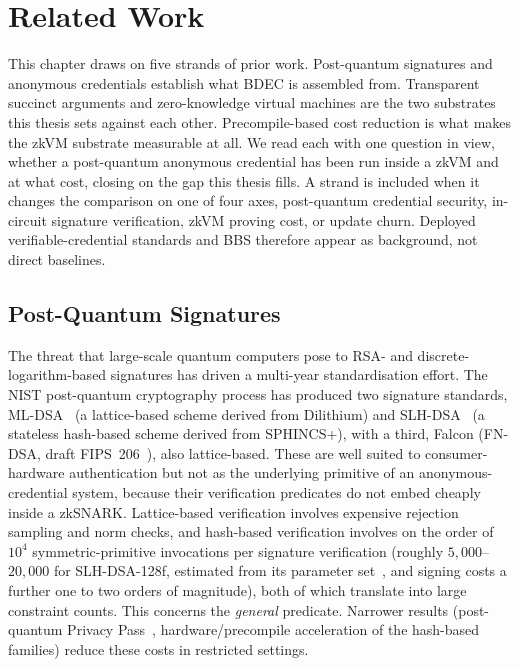 \section{Related Work}\label{sec:related}
This chapter draws on five strands of prior work. Post-quantum signatures and anonymous credentials establish what BDEC is assembled from. Transparent succinct arguments and zero-knowledge virtual machines are the two substrates this thesis sets against each other. Precompile-based cost reduction is what makes the zkVM substrate measurable at all. We read each with one question in view, whether a post-quantum anonymous credential has been run inside a zkVM and at what cost, closing on the gap this thesis fills. A strand is included when it changes the comparison on one of four axes, post-quantum credential security, in-circuit signature verification, zkVM proving cost, or update churn. Deployed verifiable-credential standards and BBS therefore appear as background, not direct baselines.

\subsection{Post-Quantum Signatures}
The threat that large-scale quantum computers pose to RSA- and discrete-logarithm-based signatures has driven a multi-year standardisation effort. The NIST post-quantum cryptography process has produced two signature standards, ML-DSA~\cite{fips204} (a lattice-based scheme derived from Dilithium) and SLH-DSA~\cite{fips205} (a stateless hash-based scheme derived from SPHINCS+), with a third, Falcon (FN-DSA, draft FIPS~206~\cite{fips206}), also lattice-based.
These are well suited to consumer-hardware authentication but not as the underlying primitive of an anonymous-credential system, because their verification predicates do not embed cheaply inside a zkSNARK. Lattice-based verification involves expensive rejection sampling and norm checks, and hash-based verification involves on the order of $10^4$ symmetric-primitive invocations per signature verification (roughly $5{,}000$--$20{,}000$ for SLH-DSA-128f, estimated from its parameter set~\cite{fips205}, and signing costs a further one to two orders of magnitude), both of which translate into large constraint counts. This concerns the \emph{general} predicate. Narrower results (post-quantum Privacy Pass~\cite{policharla2023pqprivacypass}, hardware/precompile acceleration of the hash-based families) reduce these costs in restricted settings.

